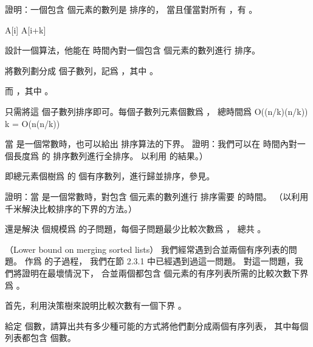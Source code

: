 \startitem
證明：一個包含  個元素的數列是  排序的，
當且僅當對所有 ，有 。
\stopitem

\startANSWER
\startformula\startmathalignment[n=1]
\NC {} \le {} \NR
\NC \Updownarrow \NR
\NC {} \le
      \NR
\NC \Updownarrow \NR
\NC {} \le {} \NR
\NC \Updownarrow \NR
\NC A[i] \le A[i+k] \NR
\stopmathalignment\stopformula
\stopANSWER

\startitem
設計一個算法，他能在  時間內對一個包含  個元素的數列進行  排序。
\stopitem

\startANSWER
將數列劃分成  個子數列，記爲 ，其中 。

而 ，其中 。

只需將這  個子數列排序即可。每個子數列元素個數爲 ，
總時間爲
\startformula
O((n/k)\lg(n/k)) \times k = O(n\lg(n/k))
\stopformula
\stopANSWER
\stopigBase

當  是一個常數時，也可以給出  排序算法的下界。
\startigBase[a,continue]
\startitem
證明：我們可以在  時間內對一個長度爲  的  排序數列進行全排序。
\hint 以利用 的結果。）
\stopitem

\startANSWER
即總元素個樹爲  的  個有序數列，進行歸並排序，參見。
\stopANSWER

\startitem
證明：當  是一個常數時，對包含  個元素的數列進行  排序需要  的時間。
（\hint 以利用千米解決比較排序的下界的方法。）
\stopitem

\startANSWER
還是解決  個規模爲  的子問題，每個子問題最少比較次數爲 ，
總共 。
\stopANSWER
\stopigBase
\stopPROBLEM

\startPROBLEM
（Lower bound on merging sorted lists）
我們經常遇到合並兩個有序列表的問題。
作爲  的子過程，
我們在節 2.3.1 中已經遇到過這一問題。
對這一問題，我們將證明在最壞情況下，
合並兩個都包含  個元素的有序列表所需的比較次數下界爲 。

首先，利用決策樹來說明比較次數有一個下界 。

\startigBase[a]
\startitem
給定  個數，請算出共有多少種可能的方式將他們劃分成兩個有序列表，
其中每個列表都包含  個數。
\stopitem

